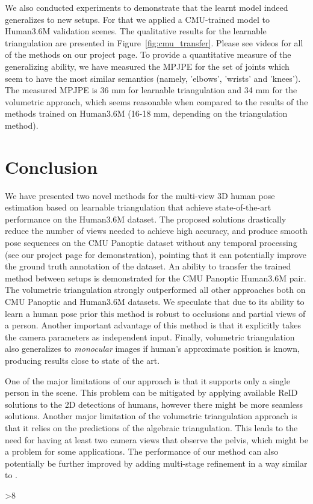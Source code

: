 \documentclass[10pt,twocolumn,letterpaper]{article}
\newcommand{\fig}[1]{Figure~\ref{fig:#1}}
\begin{document}
We also conducted experiments to demonstrate that the learnt model indeed generalizes to new setups. For that we applied a CMU-trained model to Human3.6M validation scenes. The qualitative results for the learnable triangulation are presented in \fig{cmu_transfer}. Please see videos for all of the methods on our project page. To provide a quantitative measure of the generalizing ability, we have measured the MPJPE for the set of joints which seem to have the most similar semantics (namely, 'elbows', 'wrists' and 'knees'). The measured MPJPE is 36 mm for learnable triangulation and 34 mm for the volumetric approach, which seems reasonable when compared to the results of the methods trained on Human3.6M (16-18 mm, depending on the triangulation method).  \section{Conclusion}
We have presented two novel methods for the multi-view 3D human pose estimation based on learnable triangulation that achieve state-of-the-art performance on the Human3.6M dataset. The proposed solutions drastically reduce the number of views needed to achieve high accuracy, and produce smooth pose sequences on the CMU Panoptic dataset without any temporal processing (see our project page for demonstration), pointing that it can potentially improve the ground truth annotation of the dataset. An ability to transfer the trained method between setups is demonstrated for the CMU Panoptic  Human3.6M pair.  
The volumetric triangulation strongly outperformed all other approaches both on CMU Panoptic and Human3.6M datasets. We speculate that due to its ability to learn a human pose prior this method is robust to occlusions and partial views of a person. Another important advantage of this method is that it explicitly takes the camera parameters as independent input. Finally, volumetric triangulation also generalizes to \textit{monocular} images if human's approximate position is known, producing results close to state of the art.

One of the major limitations of our approach is that it supports only a single person in the scene. This problem can be mitigated by applying available ReID solutions to the 2D detections of humans, however there might be more seamless solutions. Another major limitation of the volumetric triangulation approach is that it relies on the predictions of the algebraic triangulation. This leads to the need for having at least two camera views that observe the pelvis, which might be a problem for some applications. The performance of our method can also potentially be further improved by adding multi-stage refinement in a way similar to \cite{Tome2018}. 

 

\FloatBarrier
\ifnum\value{page}>8 \fi

{\small


}
\end{document}
